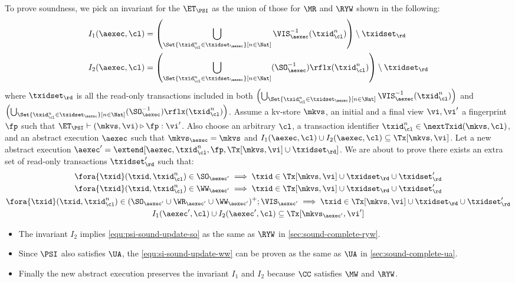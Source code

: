 To prove soundness, we pick an invariant for the \( \ET_\PSI \) as the union of those for \( \MR\) and \( \RYW \) shown in the following:
\begin{align*}
    I_1(\aexec, \cl) & =  \left( \bigcup_{\Set{\txid_{\cl}^{n} \in \txidset_{\aexec} }[ n \in \Nat ]} \VIS_{\aexec}^{-1}(\txid^n_\cl) \right) \setminus \txidset_\rd \\
    I_2(\aexec, \cl) & =  \left( \bigcup_{\Set{\txid_{\cl}^{n} \in \txidset_{\aexec} }[ n \in \Nat ]} (\SO_{\aexec}^{-1})\rflx(\txid^n_\cl) \right) \setminus \txidset_\rd
\end{align*}
where \( \txidset_\rd \) is all the read-only transactions included in both 
\( \left( \bigcup_{\Set{\txid_{\cl}^{n} \in \txidset_{\aexec} }[ n \in \Nat ]} \VIS_{\aexec}^{-1}(\txid^n_\cl) \right)\) 
and \( \left( \bigcup_{\Set{\txid_{\cl}^{n} \in \txidset_{\aexec} }[ n \in \Nat ]} (\SO_{\aexec}^{-1})\rflx(\txid^n_\cl) \right) \).
Assume a kv-store $\mkvs$, an initial and a final view $\vi, \vi'$  a fingerprint $\fp$ 
such that $\ET_{\PSI} \vdash (\mkvs, \vi) \triangleright \fp: \vi'$. 
Also choose an arbitrary $\cl$, a transaction identifier $\txid_\cl^n \in \nextTxid(\mkvs, \cl)$, 
and an abstract execution $\aexec$ such that $\mkvs_{\aexec} = \mkvs$ and 
\( I_1(\aexec, \cl) \cup I_2(\aexec, \cl) \subseteq \Tx[\mkvs, \vi] \).
Let a new abstract execution \( \aexec' = \extend[\aexec, \txid_\cl^n, \fp, \Tx[\mkvs, \vi] \cup \txidset_\rd] \).
We are about to prove there exists an extra set of read-only transactions \( \txidset'_\rd \) such that:
\begin{gather}
    \fora{\txid} (\txid, \txid_\cl^n) \in \SO_{\aexec'} \implies \txid \in \Tx[\mkvs, \vi] \cup \txidset_\rd \cup \txidset'_\rd \label{equ:psi-sound-update-so}\\
    \fora{\txid} (\txid, \txid_\cl^n) \in \WW_{\aexec'} \implies \txid \in \Tx[\mkvs, \vi] \cup \txidset_\rd \cup \txidset'_\rd \label{equ:psi-sound-update-ua}\\
    \fora{\txid} (\txid, \txid_\cl^n) \in ( \SO_{\aexec'} \cup \WR_{\aexec'} \cup \WW_{\aexec'} )^{+} ; \VIS_{\aexec'} \implies \txid \in \Tx[\mkvs, \vi] \cup \txidset_\rd \cup \txidset'_\rd \label{equ:psi-sound-update-visvis}\\
    I_1(\aexec',\cl) \cup I_2(\aexec',\cl) \subseteq \Tx[\mkvs_{\aexec'}, \vi'] \label{equ:psi-sound-inv} 
\end{gather}
\begin{itemize}
\item The invariant \( I_2 \) implies \cref{equ:psi-sound-update-so} as the same as \( \RYW \) in \cref{sec:sound-complete-ryw}.
\item Since \( \PSI \) also satisfies \( \UA \), the \cref{equ:si-sound-update-ww} can be proven as the same as \( \UA \) in \cref{sec:sound-complete-ua}.

\item Finally the new abstract execution preserves the invariant \( I_1 \) and \( I_2 \) 
because  \( \CC \) satisfies \( \MW \) and \( \RYW \).
\end{itemize}


